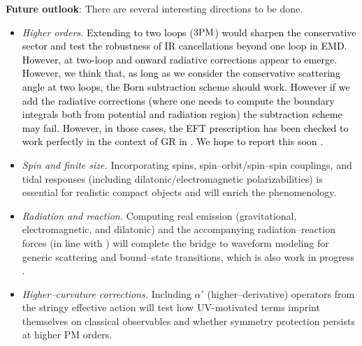 \textbf{Future outlook}:
There are several interesting directions to be done. 
\begin{itemize}
  \item \emph{Higher orders.} \textcolor{black}{Extending to two loops ($3{\rm PM}$) would sharpen the conservative sector and test the robustness of IR cancellations beyond one loop in EMD. However, at two-loop and onward radiative corrections appear to emerge. However, we think that, as long as we consider the conservative scattering angle at two loops, the Born subtraction scheme should work. However if we add the radiative corrections (where one needs to compute the boundary integrals both from potential and radiation region) the subtraction scheme may fail. However, in those cases, the EFT prescription has been checked to work perfectly in the context of GR in \cite{Cheung:2018wkq}. We hope to report this soon \cite{arpan2}.}
  \item \emph{Spin and finite size.} Incorporating spins, spin–orbit/spin–spin couplings, and tidal responses (including dilatonic/electromagnetic polarizabilities) is essential for realistic compact objects and will enrich the phenomenology.
  \item \emph{Radiation and reaction.} Computing real emission (gravitational, electromagnetic, and dilatonic) and the accompanying radiation–reaction forces (in line with \cite{Caron-Huot:2023vxl}) will complete the bridge to waveform modeling for generic scattering and bound–state transitions, which is also work in progress \cite{arpan1}.
  \item \emph{Higher–curvature corrections.} Including $\alpha'$ \cite{Metsaev:1987zx}(higher–derivative) operators from the stringy effective action will test how UV-motivated terms imprint themselves on classical observables and whether symmetry protection persists at higher PM orders.
\end{itemize}

